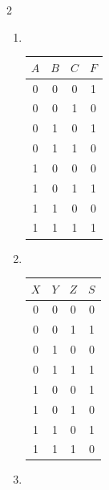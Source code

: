 \documentclass[11pt, a4paper]{article}
\begin{document}
\begin{enumerate}
\begin{multicols}{2}
\begin{enumerate}
\item ~

\begin{tabular}{ccc|c}
\toprule
$A$ & $B$ & $C$ & $F$ \\
\midrule
0 & 0 & 0 & 1 \\
0 & 0 & 1 & 0 \\
0 & 1 & 0 & 1 \\
0 & 1 & 1 & 0 \\
1 & 0 & 0 & 0 \\
1 & 0 & 1 & 1 \\
1 & 1 & 0 & 0 \\
1 & 1 & 1 & 1 \\
\bottomrule
\end{tabular}

\item ~

\begin{tabular}{ccc|c}
\toprule
$X$ & $Y$ & $Z$ & $S$ \\
\midrule
0 & 0 & 0 & 0 \\
0 & 0 & 1 & 1 \\
0 & 1 & 0 & 0 \\
0 & 1 & 1 & 1 \\
1 & 0 & 0 & 1 \\
1 & 0 & 1 & 0 \\
1 & 1 & 0 & 1 \\
1 & 1 & 1 & 0 \\
\bottomrule
\end{tabular}
\end{enumerate}
\end{multicols}

\noindent
\begin{minipage}[t]{0.48\textwidth}
\begin{enumerate}
\setcounter{enumii}{2}
\item[c)] ~


\end{enumerate}
\end{minipage}
\end{enumerate}
\end{document}
